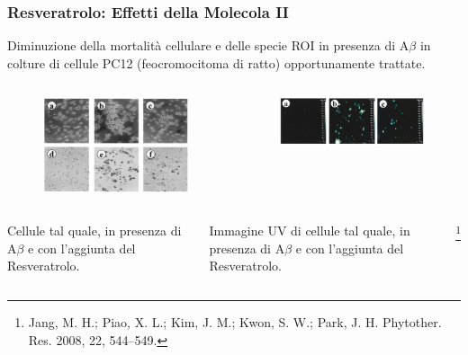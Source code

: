 \documentclass[9pt]{beamer}
\newcommand\blfootnote[1]{%
	\begingroup
	\renewcommand\thefootnote{}\footnote{#1}%
	\addtocounter{footnote}{-1}%
	\endgroup
}
\begin{document}
\begin{frame}
	\frametitle{Resveratrolo: Effetti della Molecola II}

	Diminuzione della mortalità cellulare e delle specie ROI in presenza di A$\beta$ in colture di cellule PC12 (feocromocitoma di ratto) opportunamente trattate.
	\begin{columns}
		\begin{column}{0.5\textwidth}
			\begin{figure}
				\includegraphics[width=\textwidth]{immagini/apo_resveratrolo.png}
			\end{figure}
		\end{column}
		\begin{column}{0.5\textwidth}
			\begin{figure}
				\includegraphics[width=\textwidth]{immagini/roi_resveratrolo.png}
			\end{figure}
		\end{column}
	\end{columns}
	\medskip
	\begin{columns}
		\begin{column}{0.5\textwidth}
			Cellule tal quale, in presenza di A$\beta$ e con l'aggiunta del Resveratrolo.
		\end{column}
		\begin{column}{0.5\textwidth}
			Immagine UV di cellule tal quale, in presenza di A$\beta$ e con l'aggiunta del Resveratrolo.
		\end{column}
		\blfootnote{Jang, M. H.; Piao, X. L.; Kim, J. M.; Kwon, S. W.; Park, J. H.
			Phytother. Res. 2008, 22, 544–549.}
	\end{columns}

\end{frame}
\end{document}

